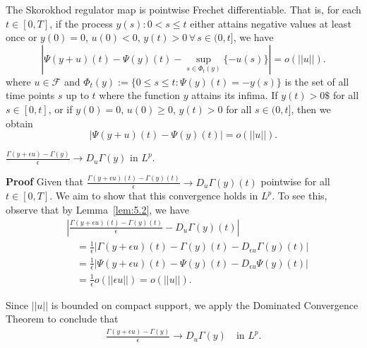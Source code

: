 \documentclass[10pt,a4paper]{amsart}
\renewenvironment{proof}[1]{\par\medskip\noindent\textbf{#1}\enspace\ignorespaces}{\par\medskip}
\begin{document}
\begin{lemma}\label{lem:5.2}
The Skorokhod regulator map is pointwise Frechet differentiable. That is, for each $t\in[0,T]$, if the process $y(s):0< s\leq t$ either attains negative values at least once or $y(0)=0$, $u(0)< 0$, $y(t)>0\,\forall \,s\in(0,t]$, we have
$$|\Psi(y+u)(t)-\Psi(y)(t)-\sup_{s\in\Phi_t(y)}\{-u(s)\}|=o(||u||).$$
where $u\in\mathcal{F}$ and $\Phi_t(y) := \{0\leq s \leq t : \Psi(y)(t) = -y(s)\}$ is the set of all time points $s$ up to $t$ where the function $y$ attains its infima.
If $y(t)>0\$$ for all $s\in[0,t]$, or if $y(0)=0$, $u(0)\geq 0$, $y(t)>0$ for all $s\in(0,t]$, then we obtain
$$|\Psi(y+u)(t)-\Psi(y)(t)|=o(||u||).$$
\end{lemma}

\begin{lemma}\label{lem:5.3}
    $\frac{\Gamma(y+\epsilon u)-\Gamma(y)}{\epsilon}\to D_u\Gamma(y)$ in $L^p$.
\end{lemma}

\begin{proof}{Proof}%
    Given that $\frac{\Gamma(y+\epsilon u)(t)-\Gamma(y)(t)}{\epsilon}\to D_u\Gamma(y)(t)$ pointwise for all $t\in[0,T]$. We aim to show that this convergence holds in $L^p$. To see this, observe that by Lemma~\ref{lem:5.2}, we have
\begin{align*}
    &\left| \frac{\Gamma(y+\epsilon u)(t)-\Gamma(y)(t)}{\epsilon}- D_u\Gamma(y)(t)\right|\\
    &\quad=\frac{1}{\epsilon}\left|\Gamma(y+\epsilon u)(t)-\Gamma(y)(t)- D_{\epsilon u}\Gamma(y)(t)\right|\\
    &\quad=\frac{1}{\epsilon}\left|\Psi(y+\epsilon u)(t)-\Psi(y)(t)- D_{\epsilon u}\Psi(y)(t)\right|\\
    &\quad=\frac{1}{\epsilon}o(||\epsilon u||)=o(|| u||).
\end{align*}  

Since $|| u||$ is bounded on compact support, we apply the Dominated Convergence Theorem to conclude that
\begin{align*}
    \frac{\Gamma(y+\epsilon u)-\Gamma(y)}{\epsilon}\to D_u\Gamma(y)\quad\text{in } L^p.
\end{align*}
 
\end{proof}
\end{document}
